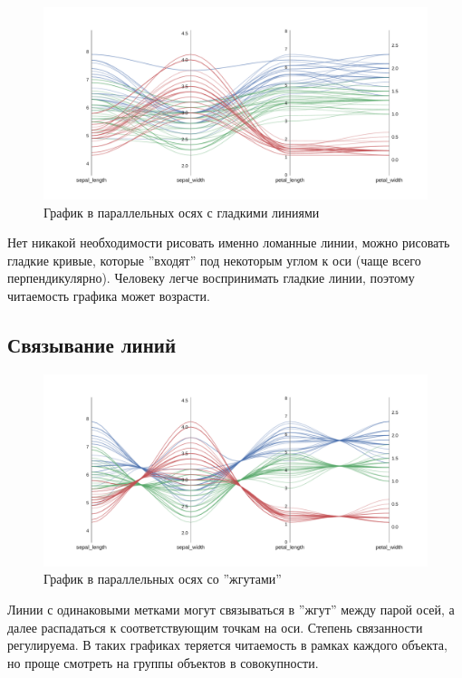 \documentclass[12pt,fleqn]{article}
\begin{document}
\begin{figure}[htb]
    \centering
    \includegraphics[width=15cm]{smooth_pc.pdf}
    \caption{График в параллельных осях с гладкими линиями}
    \label{smooth_pc}
\end{figure}

Нет никакой необходимости рисовать именно ломанные линии, можно рисовать гладкие кривые, 
которые ''входят'' под некоторым углом к оси (чаще всего перпендикулярно).
Человеку легче воспринимать гладкие линии, поэтому
читаемость графика может возрасти.\cite{state_of_the_art}

\newpage

\subsection{Связывание линий}

\begin{figure}[htb]
    \centering
    \includegraphics[width=15cm]{bundle_0.01_pc.pdf}
    \caption{График в параллельных осях со ''жгутами''}
    \label{bundle0.01_pc}
\end{figure}

Линии с одинаковыми метками могут связываться в ''жгут'' между парой осей, а 
далее распадаться к соответствующим точкам на оси. Степень связанности регулируема. В таких графиках
теряется читаемость в рамках каждого объекта, но проще смотреть на группы объектов в совокупности.\cite{bundling}
\end{document}
